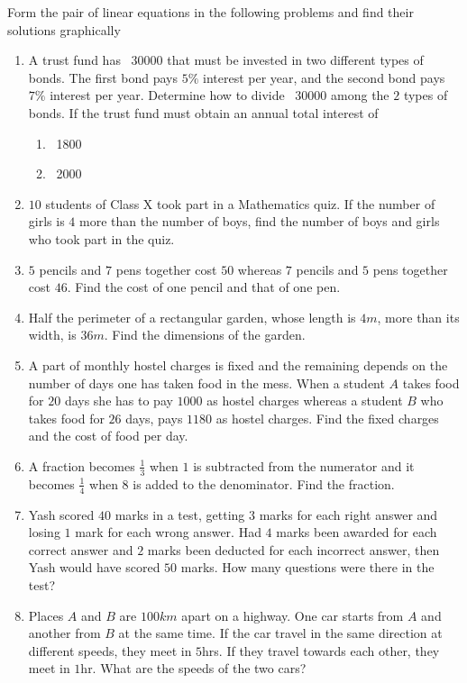 Form the pair of linear equations in the following problems and find their solutions graphically
\begin{enumerate}[label=\thesubsection.\arabic*, ref=\thesubsection.\theenumi]
\item A trust fund has \rupee~30000 that must be invested in two different types of bonds.  The first bond pays $5\%$  interest per year,  and the second bond pays $7\%$ interest per year.   Determine how to divide \rupee~30000 among the $2$ types of bonds.  If the trust fund must obtain an annual total interest of
\begin{enumerate}
\item \rupee~1800
\item \rupee~2000
\end{enumerate}
\solution
		
\item $10$ students of Class X took part in a Mathematics quiz.  If the number of girls is $4$ more than the number of boys,  find the number of boys and girls who took part in the quiz. 
\item $5$ pencils and $7$ pens together cost \rupee $50$ whereas $7$ pencils and $5$ pens together cost  \rupee $  46$.  Find the cost of one pencil and that of one pen. 
\item Half the perimeter of a rectangular garden,  whose length is $4m$,  more than its width,  is $36m$.  Find the dimensions of the garden. 
\item A part of monthly hostel charges is fixed and the remaining depends on the number of days one has taken food in the mess.  When a student $A$ takes food for $20$ days she has to pay \rupee $1000$ as hostel charges whereas a student $B$ who takes food for $26$ days,  pays \rupee $1180$ as hostel charges.  Find the fixed charges and the cost of food per day. 
\item A fraction becomes $\frac{1}{3}$ when $1$ is subtracted from the numerator and it becomes $\frac{1}{4}$ when $8$ is added to the denominator.  Find the fraction. 
\item Yash scored $40$ marks in a test,  getting $3$ marks for each right answer and losing $1$ mark for each wrong answer.  Had $4$ marks been awarded for each correct answer and $2$ marks been deducted for each incorrect answer,  then Yash would have scored $50$ marks.  How many questions were there in the test?
\item Places $A$ and $B$ are $100km$ apart on a highway.  One car starts from $A$ and another from $B$ at the same time.  If the car travel in the same direction at different speeds,  they meet in $5$hrs.  If they travel towards each other,  they meet in $1$hr.  What are the speeds of the two cars?

\end{enumerate}

